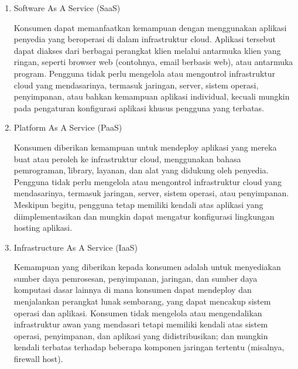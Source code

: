 \begin{enumerate}
	\item Software As A Service (SaaS)

	      Konsumen dapat memanfaatkan kemampuan dengan menggunakan aplikasi penyedia yang beroperasi di dalam infrastruktur cloud. Aplikasi tersebut dapat diakses dari berbagai perangkat klien melalui antarmuka klien yang ringan, seperti browser web (contohnya, email berbasis web), atau antarmuka program. Pengguna tidak perlu mengelola atau mengontrol infrastruktur cloud yang mendasarinya, termasuk jaringan, server, sistem operasi, penyimpanan, atau bahkan kemampuan aplikasi individual, kecuali mungkin pada pengaturan konfigurasi aplikasi khusus pengguna yang terbatas.


	\item Platform As A Service (PaaS)

	      Konsumen diberikan kemampuan untuk mendeploy aplikasi yang mereka buat atau peroleh ke infrastruktur cloud, menggunakan bahasa pemrograman, \f{library}, layanan, dan alat yang didukung oleh penyedia. Pengguna tidak perlu mengelola atau mengontrol infrastruktur cloud yang mendasarinya, termasuk jaringan, server, sistem operasi, atau penyimpanan. Meskipun begitu, pengguna tetap memiliki kendali atas aplikasi yang diimplementasikan dan mungkin dapat mengatur konfigurasi lingkungan hosting aplikasi.


	\item Infrastructure As A Service (IaaS)

	      Kemampuan yang diberikan kepada konsumen adalah untuk menyediakan sumber daya pemrosesan, penyimpanan, jaringan, dan sumber daya komputasi dasar lainnya di mana konsumen dapat mendeploy dan menjalankan perangkat lunak sembarang, yang dapat mencakup sistem operasi dan aplikasi. Konsumen tidak mengelola atau mengendalikan infrastruktur awan yang mendasari tetapi memiliki kendali atas sistem operasi, penyimpanan, dan aplikasi yang didistribusikan; dan mungkin kendali terbatas terhadap beberapa komponen jaringan tertentu (misalnya, firewall host).
\end{enumerate}


